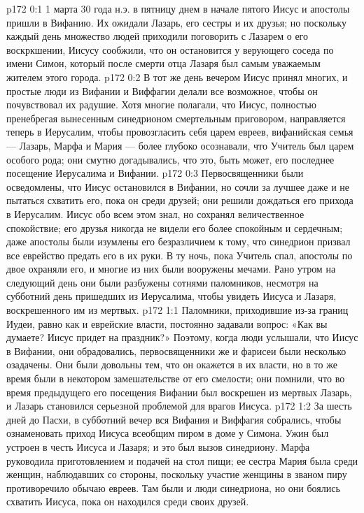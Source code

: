 \vs p172 0:1 1 марта 30 года н.э. в пятницу днем в начале пятого Иисус и апостолы пришли в Вифанию. Их ожидали Лазарь, его сестры и их друзья; но поскольку каждый день множество людей приходили поговорить с Лазарем о его воскркшении, Иисусу сообжили, что он остановится у верующего соседа по имени Симон, который после смерти отца Лазаря был самым уважаемым жителем этого города.
\vs p172 0:2 В тот же день вечером Иисус принял многих, и простые люди из Вифании и Виффагии делали все возможное, чтобы он почувствовал их радушие. Хотя многие полагали, что Иисус, полностью пренебрегая вынесенным синедрионом смертельным приговором, направляется теперь в Иерусалим, чтобы провозгласить себя царем евреев, вифанийская семья --- Лазарь, Марфа и Мария --- более глубоко осознавали, что Учитель был царем особого рода; они смутно догадывались, что это, быть может, его последнее посещение Иерусалима и Вифании.
\vs p172 0:3 Первосвященники были осведомлены, что Иисус остановился в Вифании, но сочли за лучшее даже и не пытаться схватить его, пока он среди друзей; они решили дождаться его прихода в Иерусалим. Иисус обо всем этом знал, но сохранял величественное спокойствие; его друзья никогда не видели его более спокойным и сердечным; даже апостолы были изумлены его безразличием к тому, что синедрион призвал все еврейство предать его в их руки. В ту ночь, пока Учитель спал, апостолы по двое охраняли его, и многие из них были вооружены мечами. Рано утром на следующий день они были разбужены сотнями паломников, несмотря на субботний день пришедших из Иерусалима, чтобы увидеть Иисуса и Лазаря, воскрешенного им из мертвых.
\vs p172 1:1 Паломники, приходившие из\hyp{}за границ Иудеи, равно как и еврейские власти, постоянно задавали вопрос: «Как вы думаете? Иисус придет на праздник?» Поэтому, когда люди услышали, что Иисус в Вифании, они обрадовались, первосвященники же и фарисеи были несколько озадачены. Они были довольны тем, что он окажется в их власти, но в то же время были в некотором замешательстве от его смелости; они помнили, что во время предыдущего его посещения Вифании был воскрешен из мертвых Лазарь, и Лазарь становился серьезной проблемой для врагов Иисуса.
\vs p172 1:2 За шесть дней до Пасхи, в субботний вечер вся Вифания и Виффагия собрались, чтобы ознаменовать приход Иисуса всеобщим пиром в доме у Симона. Ужин был устроен в честь Иисуса и Лазаря; и это был вызов синедриону. Марфа руководила приготовлением и подачей на стол пищи; ее сестра Мария была среди женщин, наблюдавших со стороны, поскольку участие женщины в званом пиру противоречило обычаю евреев. Там были и люди синедриона, но они боялись схватить Иисуса, пока он находился среди своих друзей.
